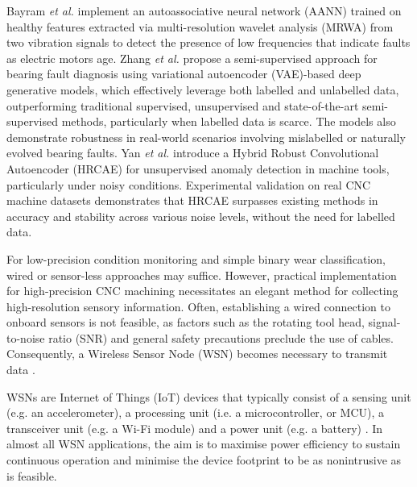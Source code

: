 \documentclass[../main.tex]{subfiles}
\begin{document}
Bayram \textit{et al.} \cite{RN4} implement an autoassociative neural network (AANN) trained on healthy features extracted via multi-resolution wavelet analysis (MRWA) from two vibration signals to detect the presence of low frequencies that indicate faults as electric motors age. Zhang \textit{et al.} \cite{RN25} propose a semi-supervised approach for bearing fault diagnosis using variational autoencoder (VAE)-based deep generative models, which effectively leverage both labelled and unlabelled data, outperforming traditional supervised, unsupervised and state-of-the-art semi-supervised methods, particularly when labelled data is scarce. The models also demonstrate robustness in real-world scenarios involving mislabelled or naturally evolved bearing faults. Yan \textit{et al.} \cite{RN26} introduce a Hybrid Robust Convolutional Autoencoder (HRCAE) for unsupervised anomaly detection in machine tools, particularly under noisy conditions. Experimental validation on real CNC machine datasets demonstrates that HRCAE surpasses existing methods in accuracy and stability across various noise levels, without the need for labelled data.

For low-precision condition monitoring and simple binary wear classification, wired or sensor-less approaches may suffice. However, practical implementation for high-precision CNC machining necessitates an elegant method for collecting high-resolution sensory information. Often, establishing a wired connection to onboard sensors is not feasible, as factors such as the rotating tool head, signal-to-noise ratio (SNR) and general safety precautions preclude the use of cables. Consequently, a Wireless Sensor Node (WSN) becomes necessary to transmit data \cite{RN29, RN28}.


WSNs are Internet of Things (IoT) devices that typically consist of a sensing unit (e.g. an accelerometer), a processing unit (i.e. a microcontroller, or MCU), a transceiver unit (e.g. a Wi-Fi module) and a power unit (e.g. a battery) \cite{KEERTHANA2020145}. In almost all WSN applications, the aim is to maximise power efficiency to sustain continuous operation and minimise the device footprint to be as nonintrusive as is feasible. 
\end{document}
